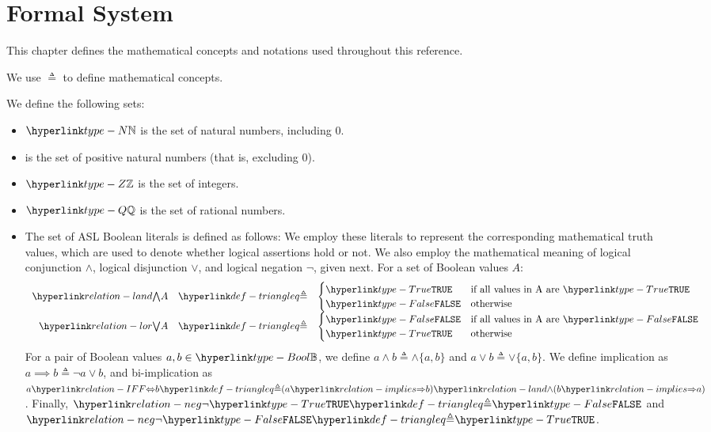 \chapter{Formal System \label{chap:FormalSystem}}

This chapter defines the mathematical concepts and notations used throughout this
reference.

\ChapterOutline

\hypertarget{def-triangleq}{}
We use $\triangleq$ to define mathematical concepts.

We define the following sets:
\begin{itemize}
\item {}$\N$ is the set of natural numbers, including $0$.

\item {} is the set of positive natural numbers (that is, excluding $0$).

\item {}$\Z$ is the set of integers.

\item {}$\Q$ is the set of rational numbers.

\item The set of ASL Boolean literals is defined as follows:
We employ these literals to represent the corresponding mathematical truth values,
which are used to denote whether logical assertions hold or not.
%
We also employ the mathematical meaning of logical conjunction $\land$, logical disjunction $\lor$,
and logical negation $\neg$, given next.
For a set of Boolean values $A$:
\[
  \begin{array}{rcl}
  \listand A &\triangleq&
  \begin{cases}
    \True & \text{if all values in A are }\True\\
    \False & \text{otherwise}
  \end{cases}\\
  \listor A &\triangleq&
  \begin{cases}
    \False & \text{if all values in A are }\False\\
    \True & \text{otherwise}
  \end{cases}
\end{array}
\]
%
%
%
For a pair of Boolean values $a,b\in\Bool$, we define $a \land b \triangleq \land\{a, b\}$
and $a \lor b \triangleq \lor\{a, b\}$.
We define implication as $a \implies b \triangleq \neg{}a \lor b$, and
bi-implication as $a \IFF b \triangleq (a \implies b) \land (b \implies a)$.
Finally, $\neg\True\triangleq\False$ and $\neg\False\triangleq\True$.


\end{itemize}
